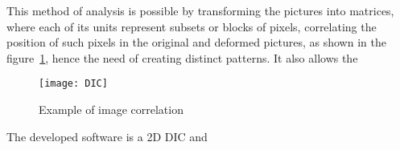 This method of analysis is possible by transforming the pictures into matrices, where each of its units represent subsets or blocks of pixels, correlating the position of such pixels in the original and deformed pictures, as shown in the figure~\ref{fig:dic}, hence the need of creating distinct patterns. It also allows the \\

\begin{figure}[h!]
	\centering
	\texttt{[image: DIC]}
	\caption{Example of image correlation}
	\label{fig:dic}
\end{figure}


The developed software is a 2D DIC and 








